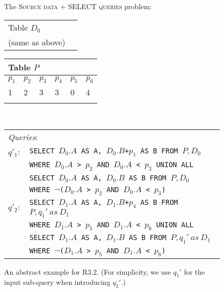 \documentclass{vldb}
\newcounter{prob}
\begin{document}
\begin{figure}[t]
The \textsc{Source data + SELECT queries} problem: \\
\begin{minipage}[t]{0.1\textwidth}
         \vspace{0pt} 
         \centering
        \begin{tabular}{ll}
            \multicolumn{2}{l}{Table $D_0$}\\
            (same as above) \\
        \end{tabular}
    \end{minipage}
\begin{minipage}[t]{0.36\textwidth}
         \vspace{0pt} 
         \centering
        \begin{tabular}{llllll}
            \multicolumn{6}{l}{Table $P$}\\
            \toprule
            \textbf{$p_1$}  & \textbf{$p_2$} & \textbf{$p_3$} & \textbf{$p_4$}  & \textbf{$p_5$} & \textbf{$p_6$} \\
            \midrule
			 1 & 2 & 3 & 3 & 0 & 4\\
            \bottomrule
            \\
        \end{tabular}
    \end{minipage}\\
        \begin{minipage}[t]{0.22\textwidth}
         \vspace{0pt} 
         \centering
        \begin{tabular}{p{2ex}p{55ex}}
         \multicolumn{2}{l}{\emph{Queries}: }\\
        $q'_1$: &
        \texttt{\small SELECT $D_0.A$ AS A, $D_0.B$+$p_1$ AS B FROM $P, D_0$ } \\
        & \texttt{\small WHERE $D_0.A$ > $p_2$ AND $D_0.A$ < $p_3$ UNION ALL}\\
        & \texttt{\small SELECT $D_0.A$ AS A, $D_0.B$ AS B FROM $P, D_0$ }\\
        &\texttt{\small  WHERE $\neg$($D_0.A$ > $p_2$ AND $D_0.A$ < $p_3$)} \\
        $q'_2:$ &
         \texttt{\small SELECT $D_1.A$ AS A, $D_1.B$+$p_4$ AS B FROM $P, q_1'\ as\ D_1$ } \\
        & \texttt{\small WHERE $D_1.A$ > $p_5$ AND $D_1.A$ < $p_6$ UNION ALL}\\
        & \texttt{\small SELECT $D_1.A$ AS A, $D_1.B$ AS B FROM $P, q_1'\ as\ D_1$ }\\
        &\texttt{\small  WHERE $\neg$($D_1.A$ > $p_5$ AND $D_1.A$ < $p_6$)} \\
        \end{tabular}
    \end{minipage}
    \caption{An abstract example for R3.2. (For simplicity, we use $q_1'$ for the input sub-query when introducing $q_2'$.)}
\label{fig:example}
\end{figure}
\end{document}
